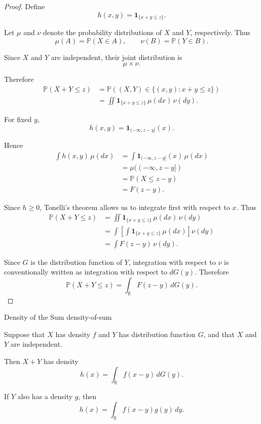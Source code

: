 \begin{proof}

Define
\[
h(x,y)
=
\mathbf{1}_{\{x+y\leq z\}}.
\]

Let $\mu$ and $\nu$ denote the probability distributions of $X$
and $Y$, respectively. Thus
\[
\mu(A)=\mathbb{P}(X\in A),
\qquad
\nu(B)=\mathbb{P}(Y\in B).
\]

Since $X$ and $Y$ are independent, their joint distribution is
\[
\mu\times\nu.
\]

Therefore
\[
\begin{aligned}
\mathbb{P}(X+Y\leq z)
&=
\mathbb{P}
\left(
(X,Y)\in
\{(x,y):x+y\leq z\}
\right)\\
&=
\iint
\mathbf{1}_{\{x+y\leq z\}}
\,\mu(dx)\,\nu(dy).
\end{aligned}
\]

For fixed $y$,
\[
h(x,y)
=
\mathbf{1}_{(-\infty,z-y]}(x).
\]

Hence
\[
\begin{aligned}
\int h(x,y)\,\mu(dx)
&=
\int
\mathbf{1}_{(-\infty,z-y]}(x)\,\mu(dx)\\
&=
\mu((-\infty,z-y])\\
&=
\mathbb{P}(X\leq z-y)\\
&=
F(z-y).
\end{aligned}
\]

Since $h\geq0$, Tonelli's theorem allows us to integrate first
with respect to $x$. Thus
\[
\begin{aligned}
\mathbb{P}(X+Y\leq z)
&=
\iint
\mathbf{1}_{\{x+y\leq z\}}
\,\mu(dx)\,\nu(dy)\\
&=
\int
\left[
\int
\mathbf{1}_{\{x+y\leq z\}}
\,\mu(dx)
\right]\nu(dy)\\
&=
\int F(z-y)\,\nu(dy).
\end{aligned}
\]

Since $G$ is the distribution function of $Y$, integration with
respect to $\nu$ is conventionally written as integration with
respect to $dG(y)$. Therefore
\[
\boxed{
\mathbb{P}(X+Y\leq z)
=
\int_{\mathbb{R}}F(z-y)\,dG(y).
}
\]

\end{proof}



\begin{theorem}{Density of the Sum}
{density-of-sum}

Suppose that $X$ has density $f$ and $Y$ has distribution function
$G$, and that $X$ and $Y$ are independent.

Then $X+Y$ has density
\[
h(x)
=
\int_{\mathbb{R}}f(x-y)\,dG(y).
\]

If $Y$ also has a density $g$, then
\[
h(x)
=
\int_{\mathbb{R}}f(x-y)g(y)\,dy.
\]

\end{theorem}

